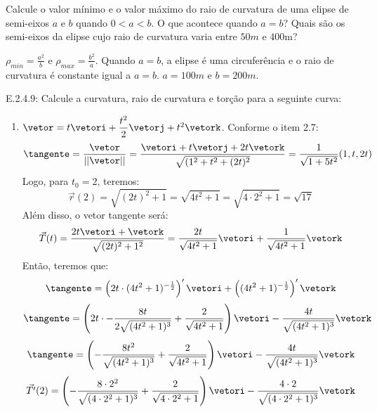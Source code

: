 \begin{exer}
 Calcule o valor mínimo e o valor máximo do raio de curvatura de uma elipse de semi-eixos $a$ e $b$ quando $0<a<b$. O que acontece quando $a=b$? Quais são os semi-eixos da elipse cujo raio de curvatura varia entre $50m$ e $400$m?
\end{exer}
\begin{resp}
 $\rho_{min}= \frac{a^2}{b}$ e $\rho_{max}= \frac{b^2}{a}$. Quando $a=b$, a elipse é uma circuferência e o raio de curvatura é constante igual a $a=b$. $a=100m$ e $b=200m$. 
\end{resp}
E.2.4.9: Calcule a curvatura, raio de curvatura e torção para a seguinte curva:
\begin{enumerate}
\item $\vetor=t\vetori+\dfrac{t^2}{2}\vetorj+t^2\vetork$. Conforme o item 2.7:
	\begin{equation*}
	\tangente=\dfrac{\vetor}{\vert\vert\vetor\vert\vert}=\dfrac{\vetori+t\vetorj+2t\vetork}{\sqrt{(1^2+t^2+(2t)^2}}=\dfrac{1}{\sqrt{1+5t^2}}(1, t, 2t)
	\end{equation*}
	Logo, para $t_0=2$, teremos:
	\begin{equation*}
		\vec{r}(2)=\sqrt{(2t)^2+1}=\sqrt{4t^2+1}=\sqrt{4\cdot2^2+1}=\sqrt{17}
	\end{equation*}
	Além disso, o vetor tangente será:	
	\begin{equation*}
		\vec{T}(t)=\dfrac{2t\vetori+\vetork}{\sqrt{(2t)^2+1^2}}=\dfrac{2t}{\sqrt{4t^2+1}}\vetori+\dfrac{1}{\sqrt{4t^2+1}}\vetork
	\end{equation*}
	Então, teremos que:
	\begin{equation*}
		\tangente=\left(2t\cdot(4t^2+1)^{-\frac{1}{2}}\right)'\vetori+\left((4t^2+1)^{-\frac{1}{2}}\right)'\vetork
	\end{equation*}
	\begin{equation*}
		\tangente=\left(2t\cdot-\dfrac{8t}{2\sqrt{(4t^2+1)^3}}+\dfrac{2}{\sqrt{4t^2+1}}\right)\vetori-\dfrac{4t}{\sqrt{(4t^2+1)^3}}\vetork
	\end{equation*}	
	\begin{equation*}
		\tangente=\left(-\dfrac{8t^2}{\sqrt{(4t^2+1)^3}}+\dfrac{2}{\sqrt{4t^2+1}}\right)\vetori-\dfrac{4t}{\sqrt{(4t^2+1)^3}}\vetork
	\end{equation*}		
	\begin{equation*}
		\vec{T'}(2)=\left(-\dfrac{8\cdot2^2}{\sqrt{(4\cdot2^2+1)^3}}+\dfrac{2}{\sqrt{4\cdot2^2+1}}\right)\vetori-\dfrac{4\cdot2}{\sqrt{(4\cdot2^2+1)^3}}\vetork

\end{equation*}
\end{enumerate}
